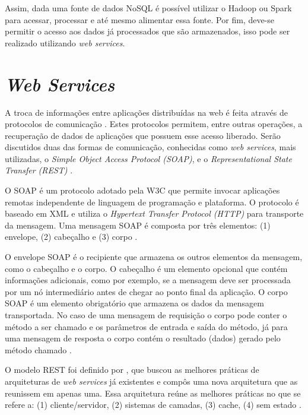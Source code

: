 Assim, dada uma fonte de dados NoSQL é possível utilizar o Hadoop ou Spark para acessar,
processar e até mesmo alimentar essa fonte. Por fim, deve-se permitir o acesso aos dados
já processados que são armazenados, isso pode ser realizado utilizando \textit{web services}. 


\section{\textit{Web Services}}
\label{sec:api}

A troca de informações entre aplicações distribuídas na web é feita através de protocolos de 
comunicação \cite{schepke2010avaliaccao}. Estes protocolos permitem, entre outras operações, a 
recuperação de dados de aplicações que possuem esse acesso liberado. Serão discutidos duas 
das formas de comunicação, conhecidas como \textit{web services}, mais utilizadas, o 
\textit{Simple Object Access Protocol (SOAP)}, e o \textit{Representational State 
Transfer (REST)} \cite{lima2012}.

O SOAP é um protocolo adotado pela W3C que permite invocar aplicações remotas independente de 
linguagem de programação e plataforma. O protocolo é baseado em XML e utiliza o 
\textit{Hypertext Transfer Protocol (HTTP)} para transporte da mensagem. Uma mensagem SOAP é 
composta por três elementos: (1) envelope, (2) cabeçalho e (3) corpo \cite{suda2003soap}.

O envelope SOAP é o recipiente que armazena os outros elementos da mensagem, como o cabeçalho 
e o corpo.  O cabeçalho é um elemento opcional que contém informações adicionais, como por 
exemplo, se a mensagem deve ser processada por um nó intermediário antes de chegar ao ponto 
final da aplicação. O corpo SOAP é um elemento obrigatório que armazena os dados da mensagem 
transportada. No caso de uma mensagem de requisição o corpo pode conter o método a ser 
chamado e os parâmetros de entrada e saída do método, já para uma mensagem de resposta o 
corpo contém o resultado (dados) gerado pelo método chamado \cite{suda2003soap}.

O modelo REST foi definido por , que buscou as melhores 
práticas de arquiteturas de \textit{web services} já existentes e compôs uma nova arquitetura 
que as reunissem em apenas uma. Essa arquitetura reúne as melhores práticas no que se refere 
a: (1) cliente/servidor, (2) sistemas de camadas, (3) cache, (4) sem estado 
\cite{fielding2000architectural}.

